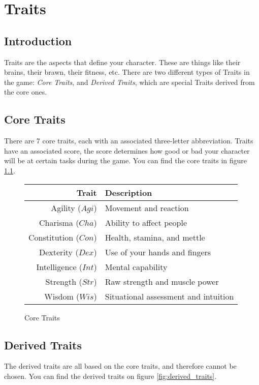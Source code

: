\chapter{Traits}
\section{Introduction}
Traits are the aspects that define your character. These are things like their brains, their brawn, their fitness, etc. There are two different types of Traits in the game: \textit{Core Traits}, and \textit{Derived Traits}, which are special Traits derived from the core ones.
\section{Core Traits}
There are 7 core traits, each with an associated three-letter abbreviation.
Traits have an associated score, the score determines how good or bad your character will be at certain tasks during the game. You can find the core traits in figure \ref{fig:core_traits}.
\begin{figure}[!h]
    \centering
    \begin{tabular}{r | l}
        \textbf{Trait}  & \textbf{Description} \\\hline
        Agility      ($Agi$) & Movement and reaction \\
        Charisma     ($Cha$) & Ability to affect people \\
        Constitution ($Con$) & Health, stamina, and mettle \\
        Dexterity    ($Dex$) & Use of your hands and fingers \\
        Intelligence ($Int$) & Mental capability \\
        Strength     ($Str$) & Raw strength and muscle power \\
        Wisdom       ($Wis$) & Situational assessment and intuition
    \end{tabular}
    \caption{Core Traits}
    \label{fig:core_traits}
\end{figure}

\section{Derived Traits}
The derived traits are all based on the core traits, and therefore cannot be chosen. You can find the derived traits on figure \ref{fig:derived_traits}.

